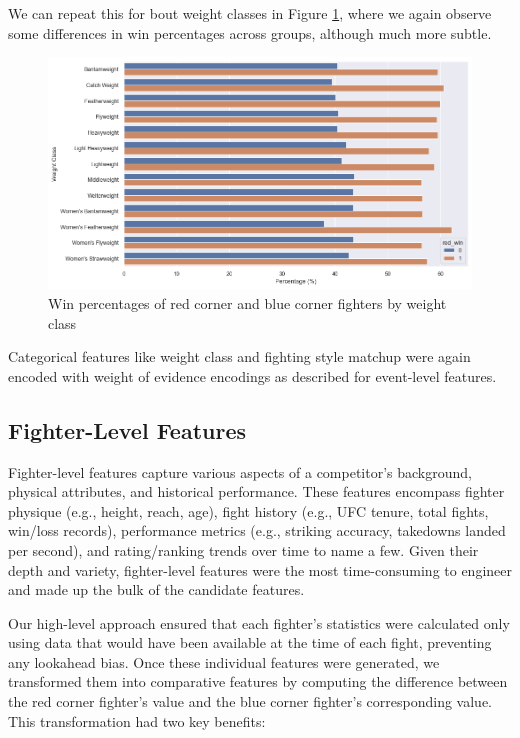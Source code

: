 \documentclass[12pt,twoside]{report}
\begin{document}
We can repeat this for bout weight classes in Figure \ref{weight_classes}, where we again observe some differences in win percentages across groups, although much more subtle.

\begin{figure}[!htb]
    \centering
    \includegraphics[width=\linewidth]{figures/weight_classes.png}
    \caption{Win percentages of red corner and blue corner fighters by weight class}
    \label{weight_classes}
\end{figure}

Categorical features like weight class and fighting style matchup were again encoded with weight of evidence encodings as described for event-level features.

\subsection{Fighter-Level Features}

Fighter-level features capture various aspects of a competitor’s background, physical attributes, and historical performance. These features encompass fighter physique (e.g., height, reach, age), fight history (e.g., UFC tenure, total fights, win/loss records), performance metrics (e.g., striking accuracy, takedowns landed per second), and rating/ranking trends over time to name a few. Given their depth and variety, fighter-level features were the most time-consuming to engineer and made up the bulk of the candidate features.

Our high-level approach ensured that each fighter’s statistics were calculated only using data that would have been available at the time of each fight, preventing any lookahead bias. Once these individual features were generated, we transformed them into comparative features by computing the difference between the red corner fighter’s value and the blue corner fighter’s corresponding value. This transformation had two key benefits:
\end{document}

